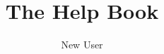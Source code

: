 \documentclass[12pt,a4paper,openany]{book}
\begin{document}
\frontmatter

\title{The \LLM{} Help Book}
\author{New User}
\maketitle

\tableofcontents  
\listoffigures  
\listoftables

\mainmatter

\clearpage

\backmatter
\printbibliography
\end{document}
